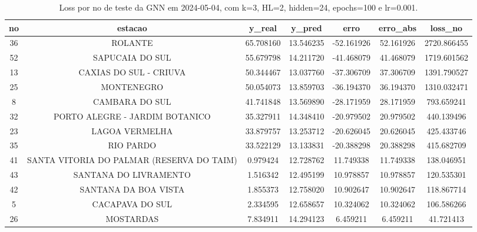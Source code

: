 \begin{table}[h]
\centering
\caption{Loss por no de teste da GNN em 2024-05-04, com k=3, HL=2, hidden=24, epochs=100 e lr=0.001.}
\label{tab:gnn_loss_k3_hl2_h24_e100_d20240504}
\begin{tabular}{ccccccc}
\toprule
no & estacao & y\_real & y\_pred & erro & erro\_abs & loss\_no \\
\midrule
36 & ROLANTE & 65.708160 & 13.546235 & -52.161926 & 52.161926 & 2720.866455 \\
52 & SAPUCAIA DO SUL & 55.679798 & 14.211720 & -41.468079 & 41.468079 & 1719.601562 \\
13 & CAXIAS DO SUL - CRIUVA & 50.344467 & 13.037760 & -37.306709 & 37.306709 & 1391.790527 \\
25 & MONTENEGRO & 50.054073 & 13.859703 & -36.194370 & 36.194370 & 1310.032471 \\
8 & CAMBARA DO SUL & 41.741848 & 13.569890 & -28.171959 & 28.171959 & 793.659241 \\
32 & PORTO ALEGRE - JARDIM BOTANICO & 35.327911 & 14.348410 & -20.979502 & 20.979502 & 440.139496 \\
23 & LAGOA VERMELHA & 33.879757 & 13.253712 & -20.626045 & 20.626045 & 425.433746 \\
35 & RIO PARDO & 33.522129 & 13.133831 & -20.388298 & 20.388298 & 415.682709 \\
41 & SANTA VITORIA DO PALMAR (RESERVA DO TAIM) & 0.979424 & 12.728762 & 11.749338 & 11.749338 & 138.046951 \\
43 & SANTANA DO LIVRAMENTO & 1.516342 & 12.495199 & 10.978857 & 10.978857 & 120.535301 \\
42 & SANTANA DA BOA VISTA & 1.855373 & 12.758020 & 10.902647 & 10.902647 & 118.867714 \\
5 & CACAPAVA DO SUL & 2.334595 & 12.658657 & 10.324062 & 10.324062 & 106.586266 \\
26 & MOSTARDAS & 7.834911 & 14.294123 & 6.459211 & 6.459211 & 41.721413 \\
\bottomrule
\end{tabular}
\end{table}
